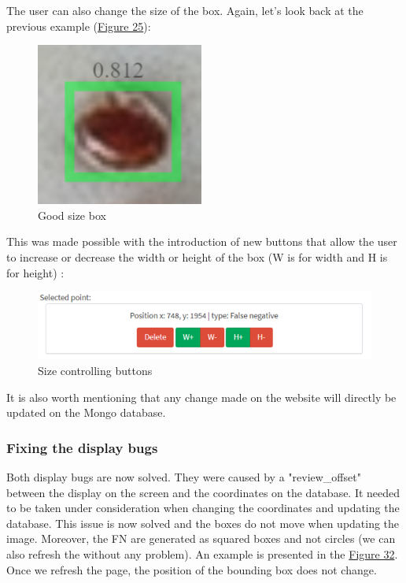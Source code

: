 \documentclass{article}
\begin{document}
\bigskip

The user can also change the size of the box. Again, let's look back at the previous example (\hyperref[Figure 25]{Figure 25}):

\begin{figure}[!ht]
  \centering
  \includegraphics[scale=0.9]{features/size.PNG}
  \caption{Good size box}
  \label{Figure 30}
\end{figure}

This was made possible with the introduction of new buttons that allow the user to increase or decrease the width or height of the box (W is for width and H is for height) :

\begin{figure}[!ht]
  \centering
  \includegraphics[scale=0.9]{features/buttons.png}
  \caption{Size controlling buttons}
  \label{Figure 31}
\end{figure}


\bigskip
\bigskip

It is also worth mentioning that any change made on the website will directly be updated on the Mongo database.


\subsubsection{Fixing the display bugs}

Both display bugs are now solved. They were caused by a "review\_offset" between the display on the screen and the coordinates on the database. It needed to be taken under consideration when changing the coordinates and updating the database. This issue is now solved and the boxes do not move when updating the image. Moreover, the FN are generated as squared boxes and not circles (we can also refresh the without any problem). An example is presented in the \hyperref[Figure 32]{Figure 32}. Once we refresh the page, the position of the bounding box does not change.
\end{document}

